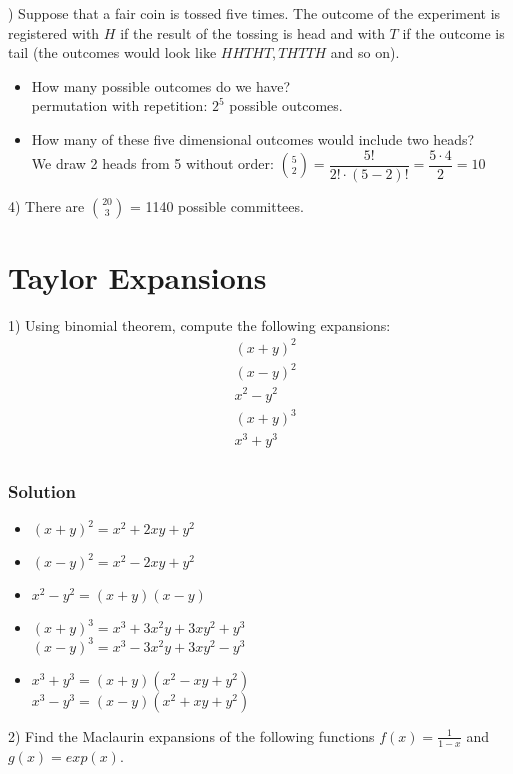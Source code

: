 \documentclass[12pt,a4paper,titlepage]{article}
\begin{document}
) Suppose that a fair coin is tossed five times. The outcome of the experiment is registered with $ H $ if the result of the tossing is head and with $ T $ if the outcome is tail (the outcomes would look like $ HHTHT, THTTH $ and so on).
\begin{itemize}
  \item How many possible outcomes do we have?\\
permutation with repetition: $2^5$ possible outcomes.
  \item How many of these five dimensional outcomes would include two heads?\\
We draw 2 heads from 5 without order: ${5 \choose 2} = \dfrac{5!}{2!\cdot(5-2)!}=\dfrac{5\cdot4}{2}=10$
\end{itemize}
4) There are ${20 \choose 3}$ = 1140 possible committees. 


\section{Taylor Expansions}
1) Using binomial theorem, compute the following expansions:
\begin{align*}
 &(x+y)^{2}  \\
 &(x-y)^{2}\\
 &x^{2}-y^{2}\\
 &(x+y)^{3} \\
 &x^{3}+y^{3}\\
\end{align*}
\subsubsection*{Solution}
\begin{itemize}
\item $(x+y)^{2}=x^{2}+2xy+y^{2}$
\item $(x-y)^{2}=x^{2}-2xy+y^{2}$
\item $ x^{2}-y^{2}=(x+y)(x-y) $
\item $ (x+y)^{3}=x^{3}+3x^{2}y+3xy^{2}+y^{3} $  \\
 $ (x-y)^3=x^{3}-3x^{2}y+3xy^{2}-y^{3} $
\item $ x^{3}+y^{3}=(x+y)(x^{2}-xy+y^{2}) $\\
 $ x^{3}-y^{3}=(x-y)(x^{2}+xy+y^{2}) $ 
\end{itemize}
2) Find the Maclaurin expansions of the following functions
$ f(x)=\frac{1}{1-x} $ and $ g(x)=exp(x)$.
\end{document}
